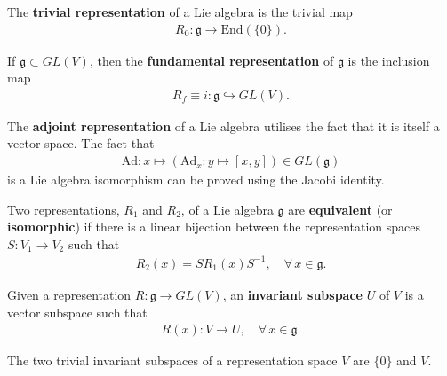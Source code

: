 \documentclass[11pt,fleqn]{article}
\begin{document}
\begin{example}
	\begin{ronumerate}
	
		\item The \textbf{trivial representation} of a Lie algebra is the trivial map 
			\begin{align}
				R_0 : \mathfrak{g} \to \text{End}\left(\{0\}\right).
			\end{align}
		\item If $\mathfrak{g} \subset GL(V)$, then the \textbf{fundamental representation} of $\mathfrak{g}$ is the inclusion map
			\begin{align}
				R_f \equiv i : \mathfrak{g} \hookrightarrow GL(V).
			\end{align}
		\item The \textbf{adjoint representation} of a Lie algebra utilises the fact that it is itself a vector space. The fact that
			\begin{align}
				\text{Ad}: x \mapsto \left( \text{Ad}_x : y \mapsto [x,y] \right) \in GL(\mathfrak{g})
			\end{align}
		is a Lie algebra isomorphism can be proved using the Jacobi identity.
	
	\end{ronumerate}
\end{example}

\begin{definition}
	Two representations, $R_1$ and $R_2$, of a Lie algebra $\mathfrak{g}$ are \textbf{equivalent} (or \textbf{isomorphic}) if there is a linear bijection between the representation spaces $S: V_1 \to V_2$ such that
		\begin{align}
			R_2(x) = S R_1(x) S^{-1}, \quad \forall \, x \in \mathfrak{g}.
		\end{align}
\end{definition}

\begin{definition}
	Given a representation $R : \mathfrak{g} \to GL(V)$, an \textbf{invariant subspace} $U$ of $V$ is a vector subspace such that
		\begin{align}
			R(x): V \to U, \quad \forall \, x \in \mathfrak{g}.
		\end{align}
\end{definition}
\begin{remark}
	The two trivial invariant subspaces of a representation space $V$ are $\{0\}$ and $V$.
\end{remark}
\end{document}

